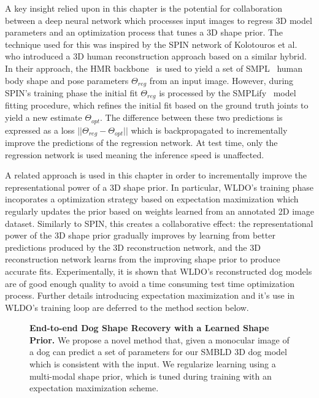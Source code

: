 A key insight relied upon in this chapter is the potential for collaboration between a deep neural network which processes input images to regress 3D model parameters and an optimization process that tunes a 3D shape prior. The technique used for this was inspired by the SPIN network of Kolotouros et al. who introduced a 3D human reconstruction approach based on a similar hybrid. In their approach, the HMR backbone~ is used to yield a set of SMPL~ human body shape and pose parameters $\Theta_{reg}$ from an input image. However, during SPIN's training phase the initial fit $\Theta_{reg}$ is processed by the SMPLify~ model fitting procedure, which refines the initial fit based on the ground truth joints to yield a new estimate $\Theta_{opt}$. The difference between these two predictions is expressed as a loss $||\Theta_{reg} - \Theta_{opt}||$ which is backpropagated to incrementally improve the predictions of the regression network. At test time, only the regression network is used meaning the inference speed is unaffected. 

A related approach is used in this chapter in order to incrementally improve the representational power of a 3D shape prior. In particular, WLDO's training phase incoporates a optimization strategy based on expectation maximization which regularly updates the prior based on weights learned from an annotated 2D image dataset. Similarly to SPIN, this creates a collaborative effect: the representational power of the 3D shape prior gradually improves by learning from better predictions produced by the 3D reconstruction network, and the 3D reconstruction network learns from the improving shape prior to produce accurate fits. Experimentally, it is shown that WLDO's reconstructed dog models are of good enough quality to avoid a time consuming test time optimization process. Further details introducing expectation maximization and it's use in WLDO's training loop are deferred to the method section below.


\begin{figure}[t]
\medbreak
\caption{
\textbf{End-to-end Dog Shape Recovery with a Learned Shape Prior.}
We propose a novel method that, given a monocular image of a dog can predict a set of parameters for our SMBLD 3D dog model which is consistent with the input. We regularize learning using a multi-modal shape prior, which is tuned during training with an expectation maximization scheme.\label{fig:splash}}
\end{figure}


